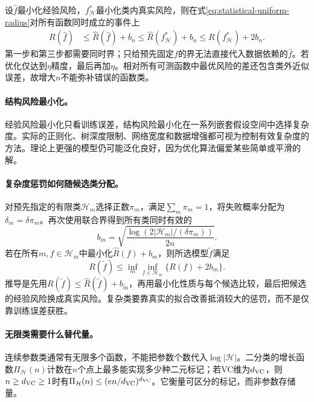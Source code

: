 设$\hat f$最小化经验风险，$f_{\mathcal H}^*$最小化类内真实风险，则在式\eqref{eq:statistical-uniform-radius}对所有函数同时成立的事件上
\begin{align}
 R(\hat f)&\leq\hat R(\hat f)+b_n
 \leq\hat R(f_{\mathcal H}^*)+b_n
 \leq R(f_{\mathcal H}^*)+2b_n.
\end{align}
第一步和第三步都需要同时界；只给预先固定$f$的界无法直接代入数据依赖的$\hat f$。若优化仅达到$\eta$精度，最后再加$\eta$。相对所有可测函数中最优风险的差还包含类外近似误差，故增大$n$不能弥补错误的函数类。

\paragraph{结构风险最小化。}
经验风险最小化只看训练误差，结构风险最小化在一系列嵌套假设空间中选择复杂度。实际的正则化、树深度限制、网络宽度和数据增强都可视为控制有效复杂度的方法。理论上更强的模型仍可能泛化良好，因为优化算法偏爱某些简单或平滑的解。

\paragraph{复杂度惩罚如何随候选类分配。}
对预先指定的有限类$\mathcal H_m$选择正数$\pi_m$，满足$\sum_m\pi_m=1$，将失败概率分配为$\delta_m=\delta\pi_m$。再次使用联合界得到所有类同时有效的
\begin{equation}
 b_m=\sqrt{\frac{\log(2|\mathcal H_m|/(\delta\pi_m))}{2n}}.
\end{equation}
若在所有$m,f\in\mathcal H_m$中最小化$\hat R(f)+b_m$，则所选模型$\tilde f$满足
\begin{equation}
 R(\tilde f)\leq\inf_m\inf_{f\in\mathcal H_m}\{R(f)+2b_m\}.
\end{equation}
推导是先用$R(\tilde f)\leq\hat R(\tilde f)+b_{\tilde m}$，再用最小化性质与每个候选比较，最后把候选的经验风险换成真实风险。复杂类要靠真实的拟合改善抵消较大的惩罚，而不是仅靠训练误差获胜。

\paragraph{无限类需要什么替代量。}
连续参数类通常有无限多个函数，不能把参数个数代入$\log|\mathcal H|$。二分类的增长函数$\Pi_{\mathcal H}(n)$计数在$n$个点上最多能实现多少种二元标记；若VC维为$d_{\rm VC}$，则$n\geq d_{\rm VC}\geq1$时有$\Pi_{\mathcal H}(n)\leq(en/d_{\rm VC})^{d_{\rm VC}}$。它衡量可区分的标记，而非参数存储量。

